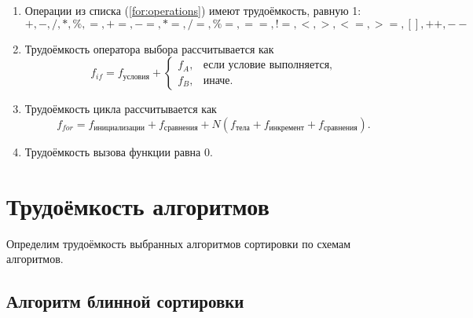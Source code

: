 \begin{enumerate}[label=\arabic*)]
	\item Операции из списка (\ref{for:operations}) имеют трудоёмкость, равную 1:
	\begin{equation}
		\label{for:operations}
		+, -, /, *, \%, =, +=, -=, *=, /=, \%=, ==, !=, <, >, <=, >=, [], ++, {-}-
	\end{equation}
	\item Трудоёмкость оператора выбора  рассчитывается как
	\begin{equation}
		\label{for:if}
		f_{if} = f_{\text{условия}} +
		\begin{cases}
			f_A, & \text{если условие выполняется,}\\
			f_B, & \text{иначе.}
		\end{cases}
	\end{equation}
	\item Трудоёмкость цикла рассчитывается как
	\begin{equation}
		\label{for:cycle}
		f_{for} = f_{\text{инициализации}} + f_{\text{сравнения}} + N(f_{\text{тела}} + f_{\text{инкремент}} + f_{\text{сравнения}}).
	\end{equation}
	\item Трудоёмкость вызова функции равна 0.
\end{enumerate}


\section{Трудоёмкость алгоритмов}

Определим трудоёмкость выбранных алгоритмов сортировки по схемам алгоритмов.

\subsection{Алгоритм блинной сортировки}

